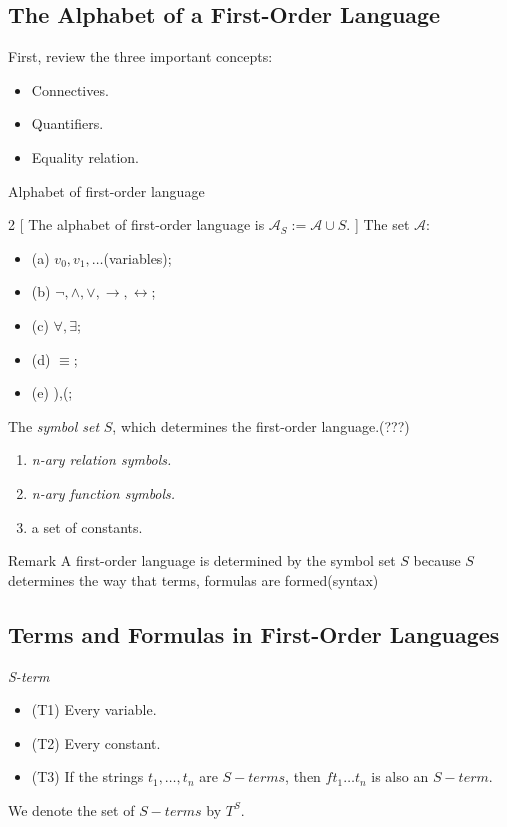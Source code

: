 \documentclass{article}
\newcommand{\page}[1]{\linkout{book_Ebbinghaus}{#1}}
\begin{document}
\subsection{The Alphabet of a First-Order Language}
First, review the three important concepts:
\begin{itemize}
    \item Connectives.
    \item Quantifiers.
    \item Equality relation.
\end{itemize}

\begin{definition}{Alphabet of first-order language}
\begin{multicols}{2}
    [
        The alphabet of first-order language is $\mathcal{A}_S := \mathcal{A} \cup S$.
    ]
    The set $\mathcal{A}$:
    \begin{itemize}
        \item (a) $v_0, v_1,\dots$(variables);
        \item (b) $\lnot, \land, \lor, \rightarrow, \leftrightarrow$;
        \item (c) $\forall, \exists$;
        \item (d) $\equiv$;
        \item (e) ),(;
    \end{itemize}
\columnbreak
    The {\color{red}\it symbol set} $S$, which determines the first-order language.(???)
    \begin{enumerate}
        \item {\it n-ary relation symbols.}
        \item {\it n-ary function symbols.}
        \item a set of constants.
    \end{enumerate}
\end{multicols}
\begin{freebox}{Remark}
    A first-order language is determined by the symbol set $S$ because {\color{green} $S$ determines the way that terms, formulas are formed(syntax)}
\end{freebox}

\end{definition}

\subsection{Terms and Formulas in First-Order Languages}

\begin{definition}{\it S-term \page{23}}
    \begin{itemize}
        \item (T1) Every variable.
        \item (T2) Every constant.
        \item (T3) If the strings $t_1,\dots,t_n$ are $S-terms$, then $ft_1 \dots t_n$ is also an $S-term$.
    \end{itemize}
    We denote the set of $S-terms$ by $T^S$.
\end{definition}
\end{document}
